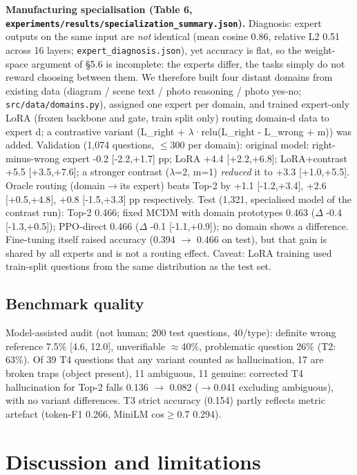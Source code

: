 \textbf{Manufacturing specialisation (Table 6, \texttt{experiments/results/specialization\_summary.json}).}
Diagnosis: expert outputs on the same input are \emph{not} identical (mean cosine 0.86, relative L2 0.51 across 16 layers; \texttt{expert\_diagnosis.json}),
yet accuracy is flat, so the weight-space argument of §5.6 is incomplete: the experts differ, the tasks simply do not reward choosing between them.
We therefore built four distant domains from existing data (diagram / scene text / photo reasoning / photo yes-no; \texttt{src/data/domains.py}), assigned one expert per domain,
and trained expert-only LoRA (frozen backbone and gate, train split only) routing domain-d data to expert d; a contrastive variant (L\_right + $\lambda$·relu(L\_right - L\_wrong + m)) was added.
Validation (1,074 questions, $\leq$300 per domain): original model: right-minus-wrong expert -0.2 {[}-2.2,+1.7{]} pp; LoRA +4.4 {[}+2.2,+6.8{]}; LoRA+contrast +5.5 {[}+3.5,+7.6{]};
a stronger contrast ($\lambda$=2, m=1) \emph{reduced} it to +3.3 {[}+1.0,+5.5{]}. Oracle routing (domain$\rightarrow$its expert) beats Top-2 by +1.1 {[}-1.2,+3.4{]}, +2.6 {[}+0.5,+4.8{]}, +0.8 {[}-1.5,+3.3{]} pp respectively.
Test (1,321, specialised model of the contrast run): Top-2 0.466; fixed MCDM with domain prototypes 0.463 ($\Delta$ -0.4 {[}-1.3,+0.5{]}); PPO-direct 0.466 ($\Delta$ -0.1 {[}-1.1,+0.9{]}); no domain shows a difference.
Fine-tuning itself raised accuracy (0.394 $\rightarrow$ 0.466 on test), but that gain is shared by all experts and is not a routing effect. Caveat: LoRA training used train-split questions from the same distribution as the test set.

\subsection{Benchmark quality}\label{benchmark-quality}

Model-assisted audit (not human; 200 test questions, 40/type): definite wrong reference 7.5\% {[}4.6, 12.0{]}, unverifiable $\approx$40\%,
problematic question 26\% (T2: 63\%). Of 39 T4 questions that any variant counted as hallucination, 17 are broken traps (object present),
11 ambiguous, 11 genuine: corrected T4 hallucination for Top-2 falls 0.136 $\rightarrow$ 0.082 ($\rightarrow$0.041 excluding ambiguous), with no variant differences.
T3 strict accuracy (0.154) partly reflects metric artefact (token-F1 0.266, MiniLM cos$\geq$0.7 0.294).

\section{Discussion and limitations}\label{discussion-and-limitations}

